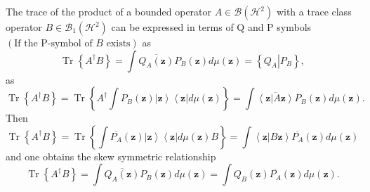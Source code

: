 \documentclass[aps,preprint]{revtex4}%
\begin{document}
The trace of the product of a bounded operator $A\in\mathcal{B}\left(
\mathcal{H}^{2}\right)  $ with a trace class operator $B\in\mathcal{B}%
_{1}\left(  \mathcal{H}^{2}\right)  $ can be expressed in terms of Q and P
symbols $\left(  \text{If the P-symbol of }B\text{ exists}\right)  $ as
\begin{equation}
\operatorname*{Tr}\left\{  A^{\dagger}B\right\}  =\int\overline{Q_{A}\left(
\mathbf{z}\right)  }P_{B}\left(  \mathbf{z}\right)  d\mu\left(  \mathbf{z}%
\right)  =\left\{  \left.  Q_{A}\right\vert P_{B}\right\}  ,
\end{equation}
as
\begin{equation}
\operatorname*{Tr}\left\{  A^{\dagger}B\right\}  =\operatorname*{Tr}\left\{
A^{\dagger}\int P_{B}\left(  \mathbf{z}\right)  \left\vert \mathbf{z}%
\right\rangle \left\langle \mathbf{z}\right\vert d\mu\left(  \mathbf{z}%
\right)  \right\}  =\int\overline{\left\langle \mathbf{z}\left\vert
A\mathbf{z}\right.  \right\rangle }P_{B}\left(  \mathbf{z}\right)  d\mu\left(
\mathbf{z}\right)  .
\end{equation}
Then
\begin{equation}
\operatorname*{Tr}\left\{  A^{\dagger}B\right\}  =\operatorname*{Tr}\left\{
\int\overline{P_{A}}\left(  \mathbf{z}\right)  \left\vert \mathbf{z}%
\right\rangle \left\langle \mathbf{z}\right\vert d\mu\left(  \mathbf{z}%
\right)  B\right\}  =\int\left\langle \mathbf{z}\left\vert B\mathbf{z}\right.
\right\rangle \overline{P_{A}}\left(  \mathbf{z}\right)  d\mu\left(
\mathbf{z}\right)
\end{equation}
and one obtains the skew symmetric relationship
\begin{equation}
\operatorname*{Tr}\left\{  A^{\dagger}B\right\}  =\int\overline{Q_{A}\left(
\mathbf{z}\right)  }P_{B}\left(  \mathbf{z}\right)  d\mu\left(  \mathbf{z}%
\right)  =\int Q_{B}\left(  \mathbf{z}\right)  \overline{P_{A}}\left(
\mathbf{z}\right)  d\mu\left(  \mathbf{z}\right)  .
\end{equation}
\end{document}
